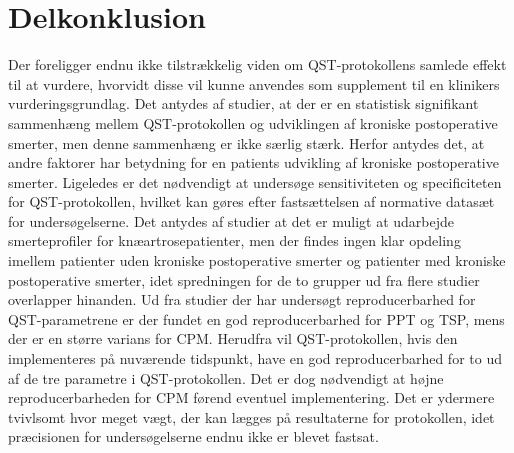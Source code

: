 \section{Delkonklusion}
Der foreligger endnu ikke tilstrækkelig viden om QST-protokollens samlede effekt til at vurdere, hvorvidt disse vil kunne anvendes som supplement til en klinikers vurderingsgrundlag. Det antydes af studier, at der er en statistisk signifikant sammenhæng mellem QST-protokollen og udviklingen af kroniske postoperative smerter, men denne sammenhæng er ikke særlig stærk. Herfor antydes det, at andre faktorer har betydning for en patients udvikling af kroniske postoperative smerter. Ligeledes er det nødvendigt at undersøge sensitiviteten og specificiteten for QST-protokollen, hvilket kan gøres efter fastsættelsen af normative datasæt for undersøgelserne. Det antydes af studier at det er muligt at udarbejde smerteprofiler for knæartrosepatienter, men der findes ingen klar opdeling imellem patienter uden kroniske postoperative smerter og patienter med kroniske postoperative smerter, idet spredningen for de to grupper ud fra flere studier overlapper hinanden. Ud fra studier der har undersøgt reproducerbarhed for QST-parametrene er der fundet en god reproducerbarhed for PPT og TSP, mens der er en større varians for CPM. Herudfra vil QST-protokollen, hvis den implementeres på nuværende tidspunkt, have en god reproducerbarhed for to ud af de tre parametre i QST-protokollen. Det er dog nødvendigt at højne reproducerbarheden for CPM førend eventuel implementering. Det er ydermere tvivlsomt hvor meget vægt, der kan lægges på resultaterne for protokollen, idet præcisionen for undersøgelserne endnu ikke er blevet fastsat.



